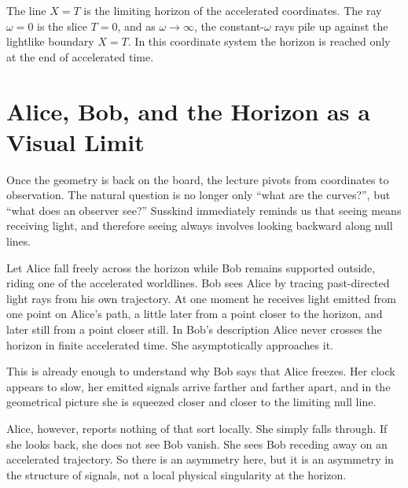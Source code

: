 The line \(X=T\) is the limiting horizon of the accelerated coordinates. The ray \(\omega=0\) is the slice \(T=0\), and as \(\omega\to\infty\), the constant-\(\omega\) rays pile up against the lightlike boundary \(X=T\). In this coordinate system the horizon is reached only at the end of accelerated time.

\section{Alice, Bob, and the Horizon as a Visual Limit}

Once the geometry is back on the board, the lecture pivots from coordinates to observation. The natural question is no longer only ``what are the curves?'', but ``what does an observer see?'' Susskind immediately reminds us that seeing means receiving light, and therefore seeing always involves looking backward along null lines.

Let Alice fall freely across the horizon while Bob remains supported outside, riding one of the accelerated worldlines. Bob sees Alice by tracing past-directed light rays from his own trajectory. At one moment he receives light emitted from one point on Alice’s path, a little later from a point closer to the horizon, and later still from a point closer still. In Bob’s description Alice never crosses the horizon in finite accelerated time. She asymptotically approaches it.

This is already enough to understand why Bob says that Alice freezes. Her clock appears to slow, her emitted signals arrive farther and farther apart, and in the geometrical picture she is squeezed closer and closer to the limiting null line.

Alice, however, reports nothing of that sort locally. She simply falls through. If she looks back, she does not see Bob vanish. She sees Bob receding away on an accelerated trajectory. So there is an asymmetry here, but it is an asymmetry in the structure of signals, not a local physical singularity at the horizon.

